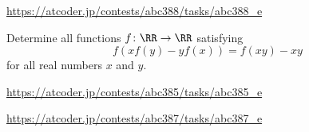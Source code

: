 \documentclass[11pt]{scrartcl}
\begin{document}
\begin{problem}[AC ABC388E]
\url{https://atcoder.jp/contests/abc388/tasks/abc388_e}
\end{problem}
\begin{problem}
  Determine all functions $f \colon \RR \to \RR$ satisfying
  \[ f\left( xf(y)-yf(x) \right) = f(xy)-xy \]
  for all real numbers $x$ and $y$.

\end{problem}
\begin{problem}[AC ABC385E]
\url{https://atcoder.jp/contests/abc385/tasks/abc385_e}
\end{problem}
\begin{problem}[AC ABC387E]
\url{https://atcoder.jp/contests/abc387/tasks/abc387_e}
\end{problem}
\end{document}
